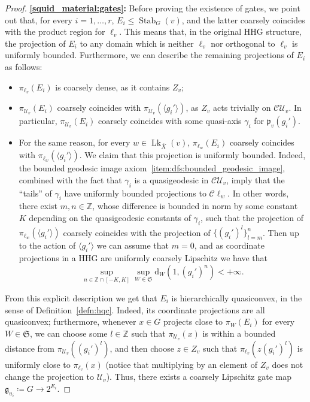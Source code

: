 \documentclass[svgnames]{amsart}
\theoremstyle{plain}
\theoremstyle{definition}
\newcommand{\Z}{\mathbb{Z}}
\newcommand{\frakS}{\mathfrak S}
\newcommand{\C}{\mathcal C}
\newcommand{\ov}[1]{\overline{#1}}
\newcommand{\U}{\mathcal{U}}
\newcommand{\dist}{\mathrm{d}}
\newcommand{\link}{\operatorname{Lk}}
\newcommand{\Stab}[2]{\operatorname{Stab}_{#1}(#2)}
\newcommand{\gate}{\mathfrak{g}}
\newcommand{\p}{\mathfrak{p}}
\begin{document}
\begin{proof}
\par\medskip
\textbf{\eqref{squid_material:gates}:}
Before proving the existence of gates, we point out that, for every $i=1,\ldots, r$, $E_i\le \Stab{G}{v}$, and the latter coarsely coincides with the product region for $\ell_v$. This means that, in the original HHG structure, the projection of $E_i$ to any domain which is neither $\ell_v$ nor orthogonal to $\ell_v$ is uniformly bounded. Furthermore, we can describe the remaining projections of $E_i$ as follows:
\begin{itemize}
    \item $\pi_{\ell_v}(E_i)$ is coarsely dense, as it contains $Z_v$;
    \item $\pi_{\U_v}(E_i)$ coarsely coincides with $\pi_{\U_v}(\langle g_i'\rangle)$, as $Z_v$ acts trivially on $\C\U_v$. In particular, $\pi_{\U_v}(E_i)$ coarsely coincides with some quasi-axis $\gamma_i$ for $\p_v(g_i')$.
    \item For the same reason, for every $w\in\link_{\ov X}(v)$, $\pi_{\ell_w}(E_i)$ coarsely coincides with $\pi_{\ell_w}(\langle g_i'\rangle)$. We claim that this projection is uniformly bounded. Indeed, the bounded geodesic image axiom~\eqref{item:dfs:bounded_geodesic_image}, combined with the fact that $\gamma_i$ is a quasigeodesic in $\C\U_v$, imply that the “tails” of $\gamma_i$ have uniformly bounded projections to $\C\ell_w$. In other words, there exist $m,n\in\mathbb{Z}$, whose difference is bounded in norm by some constant $K$ depending on the quasigeodesic constants of $\gamma_i$, such that the projection of $\pi_{\ell_w}(\langle g_i'\rangle)$ coarsely coincides with the projection of $\{(g_i')^{l}\}_{l=m}^n$. Then up to the action of $\langle g_i'\rangle $ we can assume that $m=0$, and as coordinate projections in a HHG are uniformly coarsely Lipschitz we have that
    $$\sup_{n\in \Z\cap[-K,K]}\sup_{W\in\frakS}\dist_W(1, (g_i')^{n})<+\infty. $$
\end{itemize}

From this explicit description we get that $E_i$ is hierarchically quasiconvex, in the sense of Definition~\ref{defn:hqc}. Indeed, its coordinate projections are all quasiconvex; furthermore, whenever $x\in G$ projects close to $\pi_W(E_i)$ for every $W\in\frakS$, we can choose some $l\in\mathbb{Z}$ such that $\pi_{\U_v}(x)$ is within a bounded distance from $\pi_{\U_v}((g_i')^{l})$, and then choose $z\in Z_v$ such that $\pi_{\ell_v}(z(g_i')^{l})$ is uniformly close to $\pi_{\ell_v}(x)$ (notice that multiplying by an element of $Z_v$ does not change the projection to $\U_v$). Thus, there exists a coarsely Lipschitz gate map $\gate_{u_i}\coloneq G\to 2^{E_i}$. 



\end{proof}
\end{document}
